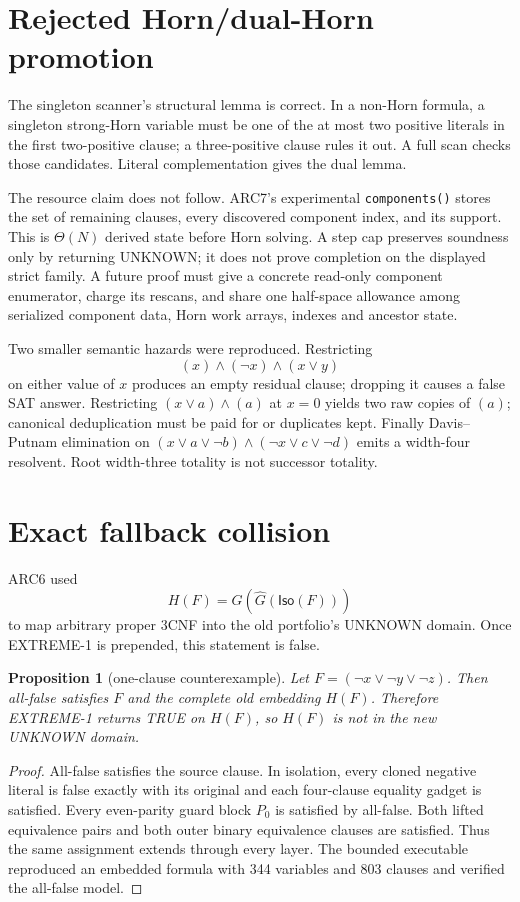 \documentclass[11pt]{article}
\newtheorem{proposition}[theorem]{Proposition}
\begin{document}
\section{Rejected Horn/dual-Horn promotion}

The singleton scanner's structural lemma is correct.  In a non-Horn formula,
a singleton strong-Horn variable must be one of the at most two positive
literals in the first two-positive clause; a three-positive clause rules it
out.  A full scan checks those candidates.  Literal complementation gives
the dual lemma.

The resource claim does not follow.  ARC7's experimental
\texttt{components()} stores the set of remaining clauses, every discovered
component index, and its support.  This is $\Theta(N)$ derived state before
Horn solving.  A step cap preserves soundness only by returning UNKNOWN; it
does not prove completion on the displayed strict family.  A future proof
must give a concrete read-only component enumerator, charge its rescans, and
share one half-space allowance among serialized component data, Horn work
arrays, indexes and ancestor state.

Two smaller semantic hazards were reproduced.  Restricting
\[
(x)\wedge(\neg x)\wedge(x\vee y)
\]
on either value of $x$ produces an empty residual clause; dropping it causes
a false SAT answer.  Restricting $(x\vee a)\wedge(a)$ at $x=0$ yields two raw
copies of $(a)$; canonical deduplication must be paid for or duplicates kept.
Finally Davis--Putnam elimination on
$(x\vee a\vee\neg b)\wedge(\neg x\vee c\vee\neg d)$ emits a width-four
resolvent.  Root width-three totality is not successor totality.

\section{Exact fallback collision}

ARC6 used
\[
H(F)=G(\widehat G(\mathsf{Iso}(F)))
\]
to map arbitrary proper $3$CNF into the old portfolio's UNKNOWN domain.  Once
\textsc{EXTREME-1} is prepended, this statement is false.

\begin{proposition}[one-clause counterexample]
Let $F=(\neg x\vee\neg y\vee\neg z)$.  Then all-false satisfies $F$ and the
complete old embedding $H(F)$.  Therefore \textsc{EXTREME-1} returns TRUE on
$H(F)$, so $H(F)$ is not in the new UNKNOWN domain.
\end{proposition}
\begin{proof}
All-false satisfies the source clause.  In isolation, every cloned negative
literal is false exactly with its original and each four-clause equality
gadget is satisfied.  Every even-parity guard block $P_0$ is satisfied by
all-false.  Both lifted equivalence pairs and both outer binary equivalence
clauses are satisfied.  Thus the same assignment extends through every
layer.  The bounded executable reproduced an embedded formula with 344
variables and 803 clauses and verified the all-false model.
\end{proof}
\end{document}
